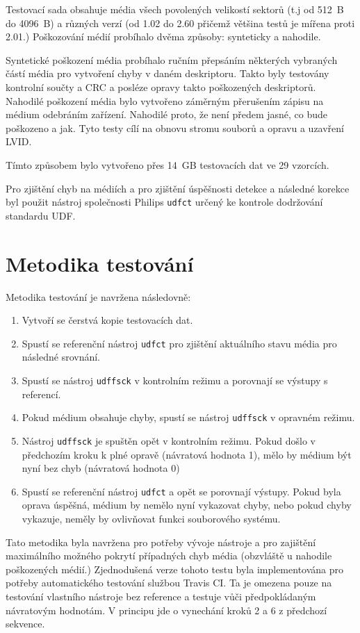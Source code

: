 Testovací sada obsahuje média všech povolených velikostí sektorů (t.j od 512~B do 4096~B) a různých verzí (od 1.02 do 2.60 přičemž většina testů je mířena proti 2.01.) Poškozování médií probíhalo dvěma způsoby: synteticky a nahodile.

Syntetické poškození média probíhalo ručním přepsáním některých vybraných částí média pro vytvoření chyby v daném deskriptoru. Takto byly testovány kontrolní součty a CRC a posléze opravy takto poškozených deskriptorů.
Nahodilé poškození média bylo vytvořeno záměrným přerušením zápisu na médium odebráním zařízení. Nahodilé proto, že není předem jasné, co bude poškozeno a jak. Tyto testy cílí na obnovu stromu souborů a opravu a uzavření LVID.

Tímto způsobem bylo vytvořeno přes 14~GB testovacích dat ve 29 vzorcích.

Pro zjištění chyb na médiích a pro zjištění úspěšnosti detekce a následné korekce byl použit nástroj společnosti Philips \texttt{udfct} \cite{wayback} určený ke kontrole dodržování standardu UDF.

\section{Metodika testování}
\label{sec:metodika}
Metodika testování je navržena následovně:
\begin{enumerate}
    \item Vytvoří se čerstvá kopie testovacích dat.
    \item Spustí se referenční nástroj \texttt{udfct} \cite{wayback} pro zjištění aktuálního stavu média pro následné srovnání.
    \item Spustí se nástroj \texttt{udffsck} v kontrolním režimu a porovnají se výstupy s referencí.
    \item Pokud médium obsahuje chyby, spustí se nástroj \texttt{udffsck} v opravném režimu.
    \item Nástroj \texttt{udffsck} je spuštěn opět v kontrolním režimu. Pokud došlo v předchozím kroku k plné opravě (návratová hodnota 1), mělo by médium být nyní bez chyb (návratová hodnota 0)
    \item Spustí se referenční nástroj \texttt{udfct} a opět se porovnají výstupy. Pokud byla oprava úspěšná, médium by nemělo nyní vykazovat chyby, nebo pokud chyby vykazuje, neměly by ovlivňovat funkci souborového systému.
\end{enumerate}
Tato metodika byla navržena pro potřeby vývoje nástroje a pro zajištění maximálního možného pokrytí případných chyb média (obzvláště u nahodile poškozených médií.) Zjednodušená verze tohoto testu byla implementována pro potřeby automatického testování službou Travis CI. Ta je omezena pouze na testování vlastního nástroje bez reference a testuje vůči předpokládaným návratovým hodnotám. V principu jde o vynechání kroků 2 a 6 z předchozí sekvence.

